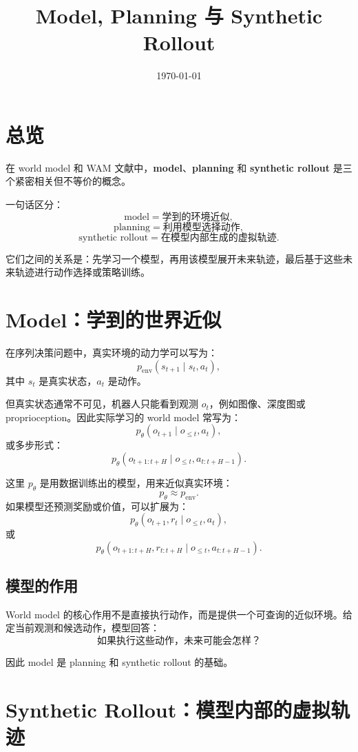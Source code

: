 \documentclass[11pt,a4paper]{ctexart}
\title{Model, Planning 与 Synthetic Rollout}
\author{}
\date{\today}
\begin{document}
\maketitle

\section{总览}

在 world model 和 WAM 文献中，\textbf{model}、\textbf{planning} 和 \textbf{synthetic rollout} 是三个紧密相关但不等价的概念。

一句话区分：
\[
  \text{model} = \text{学到的环境近似},
\]
\[
  \text{planning} = \text{利用模型选择动作},
\]
\[
  \text{synthetic rollout} = \text{在模型内部生成的虚拟轨迹}.
\]

它们之间的关系是：先学习一个模型，再用该模型展开未来轨迹，最后基于这些未来轨迹进行动作选择或策略训练。

\section{Model：学到的世界近似}

在序列决策问题中，真实环境的动力学可以写为：
\[
  p_{\mathrm{env}}(s_{t+1}\mid s_t,a_t),
\]
其中 $s_t$ 是真实状态，$a_t$ 是动作。

但真实状态通常不可见，机器人只能看到观测 $o_t$，例如图像、深度图或 proprioception。因此实际学习的 world model 常写为：
\[
  p_\theta(o_{t+1}\mid o_{\le t},a_t),
\]
或多步形式：
\[
  p_\theta(o_{t+1:t+H}\mid o_{\le t},a_{t:t+H-1}).
\]

这里 $p_\theta$ 是用数据训练出的模型，用来近似真实环境：
\[
  p_\theta \approx p_{\mathrm{env}}.
\]
如果模型还预测奖励或价值，可以扩展为：
\[
  p_\theta(o_{t+1},r_t\mid o_{\le t},a_t),
\]
或
\[
  p_\theta(o_{t+1:t+H},r_{t:t+H}\mid o_{\le t},a_{t:t+H-1}).
\]

\subsection{模型的作用}

World model 的核心作用不是直接执行动作，而是提供一个可查询的近似环境。给定当前观测和候选动作，模型回答：
\[
  \text{如果执行这些动作，未来可能会怎样？}
\]

因此 model 是 planning 和 synthetic rollout 的基础。

\section{Synthetic Rollout：模型内部的虚拟轨迹}
\end{document}
